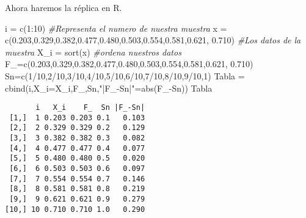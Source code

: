 \documentclass[
  a4paper,
  oneside,
  openany]{book}
\newenvironment{Shaded}{\begin{snugshade}}{\end{snugshade}}
\newcommand{\AttributeTok}[1]{\textcolor[rgb]{0.77,0.63,0.00}{#1}}
\newcommand{\CommentTok}[1]{\textcolor[rgb]{0.56,0.35,0.01}{\textit{#1}}}
\newcommand{\DecValTok}[1]{\textcolor[rgb]{0.00,0.00,0.81}{#1}}
\newcommand{\FloatTok}[1]{\textcolor[rgb]{0.00,0.00,0.81}{#1}}
\newcommand{\FunctionTok}[1]{\textcolor[rgb]{0.00,0.00,0.00}{#1}}
\newcommand{\NormalTok}[1]{#1}
\newcommand{\OtherTok}[1]{\textcolor[rgb]{0.56,0.35,0.01}{#1}}
\newcommand{\SpecialCharTok}[1]{\textcolor[rgb]{0.00,0.00,0.00}{#1}}
\newcommand{\StringTok}[1]{\textcolor[rgb]{0.31,0.60,0.02}{#1}}
\begin{document}
Ahora haremos la réplica en R.

\begin{Shaded}
\begin{Highlighting}[]
\NormalTok{i }\OtherTok{=} \FunctionTok{c}\NormalTok{(}\DecValTok{1}\SpecialCharTok{:}\DecValTok{10}\NormalTok{) }\CommentTok{\#Representa el numero de nuestra muestra}
\NormalTok{x }\OtherTok{=} \FunctionTok{c}\NormalTok{(}\FloatTok{0.203}\NormalTok{,}\FloatTok{0.329}\NormalTok{,}\FloatTok{0.382}\NormalTok{,}\FloatTok{0.477}\NormalTok{,}\FloatTok{0.480}\NormalTok{,}\FloatTok{0.503}\NormalTok{,}\FloatTok{0.554}\NormalTok{,}\FloatTok{0.581}\NormalTok{,}\FloatTok{0.621}\NormalTok{, }\FloatTok{0.710}\NormalTok{) }\CommentTok{\#Los datos de la muestra}
\NormalTok{X\_i }\OtherTok{=} \FunctionTok{sort}\NormalTok{(x) }\CommentTok{\#ordena nuestros datos}
\NormalTok{F\_}\OtherTok{=}\FunctionTok{c}\NormalTok{(}\FloatTok{0.203}\NormalTok{,}\FloatTok{0.329}\NormalTok{,}\FloatTok{0.382}\NormalTok{,}\FloatTok{0.477}\NormalTok{,}\FloatTok{0.480}\NormalTok{,}\FloatTok{0.503}\NormalTok{,}\FloatTok{0.554}\NormalTok{,}\FloatTok{0.581}\NormalTok{,}\FloatTok{0.621}\NormalTok{, }\FloatTok{0.710}\NormalTok{)}
\NormalTok{Sn}\OtherTok{=}\FunctionTok{c}\NormalTok{(}\DecValTok{1}\SpecialCharTok{/}\DecValTok{10}\NormalTok{,}\DecValTok{2}\SpecialCharTok{/}\DecValTok{10}\NormalTok{,}\DecValTok{3}\SpecialCharTok{/}\DecValTok{10}\NormalTok{,}\DecValTok{4}\SpecialCharTok{/}\DecValTok{10}\NormalTok{,}\DecValTok{5}\SpecialCharTok{/}\DecValTok{10}\NormalTok{,}\DecValTok{6}\SpecialCharTok{/}\DecValTok{10}\NormalTok{,}\DecValTok{7}\SpecialCharTok{/}\DecValTok{10}\NormalTok{,}\DecValTok{8}\SpecialCharTok{/}\DecValTok{10}\NormalTok{,}\DecValTok{9}\SpecialCharTok{/}\DecValTok{10}\NormalTok{,}\DecValTok{1}\NormalTok{)}
\NormalTok{Tabla }\OtherTok{=} \FunctionTok{cbind}\NormalTok{(i,}\AttributeTok{X\_i=}\NormalTok{X\_i,F\_,Sn,}\StringTok{"|F\_{-}Sn|"}\OtherTok{=}\FunctionTok{abs}\NormalTok{(F\_}\SpecialCharTok{{-}}\NormalTok{Sn))}
\NormalTok{Tabla}
\end{Highlighting}
\end{Shaded}

\begin{verbatim}
       i   X_i    F_  Sn |F_-Sn|
 [1,]  1 0.203 0.203 0.1   0.103
 [2,]  2 0.329 0.329 0.2   0.129
 [3,]  3 0.382 0.382 0.3   0.082
 [4,]  4 0.477 0.477 0.4   0.077
 [5,]  5 0.480 0.480 0.5   0.020
 [6,]  6 0.503 0.503 0.6   0.097
 [7,]  7 0.554 0.554 0.7   0.146
 [8,]  8 0.581 0.581 0.8   0.219
 [9,]  9 0.621 0.621 0.9   0.279
[10,] 10 0.710 0.710 1.0   0.290
\end{verbatim}
\end{document}
